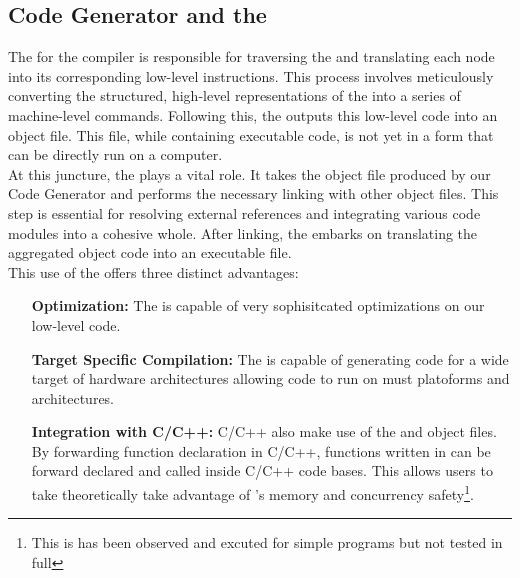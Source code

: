 \subsection{Code Generator and the \gcc{}}
\label{sec:LLVM}

The \codeGen{} for the \lang{} compiler is responsible for traversing the
\ast{} and translating each node into its corresponding low-level
instructions. This process involves meticulously converting the structured,
high-level representations of the \ast{} into a series of machine-level commands.
Following this, the \codeGen{} outputs this low-level code into an object file.
This file, while containing executable code, is not yet in a form that can be
directly run on a computer. \\

At this juncture, the \gcc{} plays a vital role. It
takes the object file produced by our Code Generator and performs the necessary
linking with other object files. This step is essential for resolving external
references and integrating various code modules into a cohesive whole. After linking,
the \gcc{} embarks on translating the aggregated object code into an executable file. \\

This use of the \gcc{} offers three distinct advantages: 

\begin{itemize}
  \item[\textbf{Optimization:}] The \gcc{} is capable of very sophisitcated
    optimizations on our low-level code.
  \item[\textbf{Target Specific Compilation:}] The \gcc{} is capable of generating code
    for a wide target of hardware architectures allowing \lang{} code to run on must
    platoforms and architectures.
  \item[\textbf{Integration with C/C++:}] C/C++ also make use of the \gcc{} and
    object files. By forwarding function declaration in C/C++, functions written in
    \lang{} can be forward declared and called inside C/C++ code bases. This allows
    users to take theoretically take advantage of \lang{}'s memory and concurrency
    safety\footnote{This is has been observed and excuted for simple programs but
    not tested in full}.
\end{itemize}

